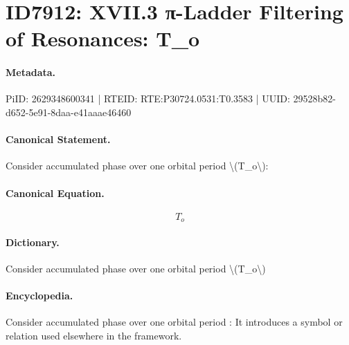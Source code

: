 \section*{ID7912: XVII.3 π-Ladder Filtering of Resonances: T\_o}
\paragraph{Metadata.}
PiID: 2629348600341 | RTEID: RTE:P30724.0531:T0.3583 | UUID: 29528b82-d652-5e91-8daa-e41aaae46460

\paragraph{Canonical Statement.}
Consider accumulated phase over one orbital period \textbackslash{}(T\_o\textbackslash{}):

\paragraph{Canonical Equation.}
\[
T_o
\]

\paragraph{Dictionary.}
Consider accumulated phase over one orbital period \textbackslash{}(T\_o\textbackslash{})

\paragraph{Encyclopedia.}
Consider accumulated phase over one orbital period : It introduces a symbol or relation used elsewhere in the framework.
